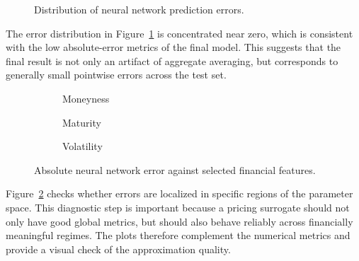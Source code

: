 \begin{figure}[H]
    \centering
    \caption{Distribution of neural network prediction errors.}
    \label{fig:final-error-distribution}
\end{figure}

The error distribution in Figure~\ref{fig:final-error-distribution} is concentrated near zero, which is consistent with the low absolute-error metrics of the final model.
This suggests that the final result is not only an artifact of aggregate averaging, but corresponds to generally small pointwise errors across the test set.

\begin{figure}[H]
    \centering
    \begin{subfigure}{0.32\linewidth}
        \centering
        \caption{Moneyness}
    \end{subfigure}
    \begin{subfigure}{0.32\linewidth}
        \centering
        \caption{Maturity}
    \end{subfigure}
    \begin{subfigure}{0.32\linewidth}
        \centering
        \caption{Volatility}
    \end{subfigure}
    \caption{Absolute neural network error against selected financial features.}
    \label{fig:final-error-diagnostics}
\end{figure}

Figure~\ref{fig:final-error-diagnostics} checks whether errors are localized in specific regions of the parameter space.
This diagnostic step is important because a pricing surrogate should not only have good global metrics, but should also behave reliably across financially meaningful regimes.
The plots therefore complement the numerical metrics and provide a visual check of the approximation quality.
